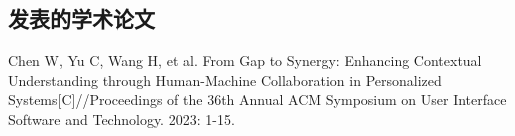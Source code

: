 
\begin{resume}

  \section*{发表的学术论文}

  \begin{achievements}
    \item Chen W, Yu C, Wang H, et al. From Gap to Synergy: Enhancing Contextual Understanding through Human-Machine Collaboration in Personalized Systems[C]//Proceedings of the 36th Annual ACM Symposium on User Interface Software and Technology. 2023: 1-15.
  \end{achievements}

\end{resume}
